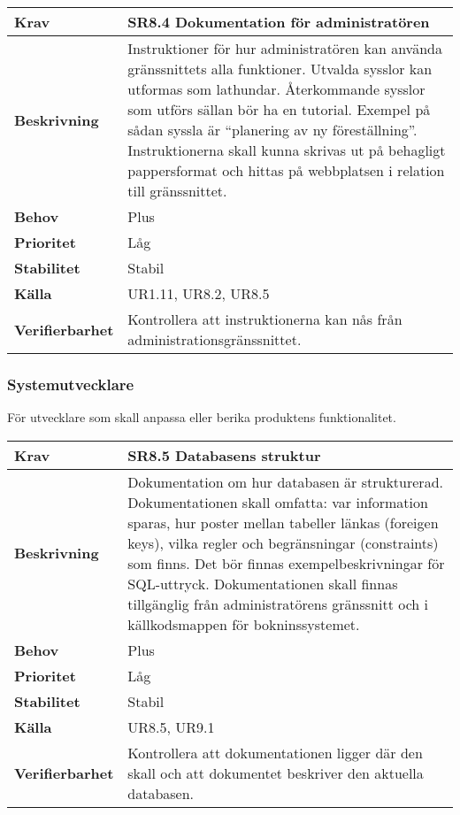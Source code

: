 \documentclass[a4paper, twoside, 11pt, titlepage]{article}
\begin{document}
		\begin {table} [ht] \begin{tabular} { p{2.6cm} p{12.5cm} }
			\hline
			\sffamily\textbf{Krav} & \sffamily\textbf{SR8.4 Dokumentation för administratören } \\
			\hline
			\sffamily\textbf{Beskrivning} & Instruktioner för hur administratören kan använda gränssnittets alla funktioner. Utvalda sysslor kan utformas som lathundar. Återkommande sysslor som utförs sällan bör ha en tutorial. Exempel på sådan syssla är ``planering av ny föreställning''. Instruktionerna skall kunna skrivas ut på behagligt pappersformat och hittas på webbplatsen i relation till gränssnittet.  \\
			\hline
			\sffamily\textbf{Behov} & Plus  \\
			\hline
			\sffamily\textbf{Prioritet} & Låg  \\
			\hline
			\sffamily\textbf{Stabilitet} & Stabil  \\
			\hline
			\sffamily\textbf{Källa} & UR1.11, UR8.2, UR8.5  \\
			\hline
			\sffamily\textbf{Verifierbarhet} & Kontrollera att instruktionerna kan nås från administrationsgränssnittet.  \\
			\hline
		\end{tabular} \end{table} \FloatBarrier


		\subsubsection{Systemutvecklare}


		För utvecklare som skall anpassa eller berika produktens funktionalitet.

		\begin {table} [ht] \begin{tabular} { p{2.6cm} p{12.5cm} }
			\hline
			\sffamily\textbf{Krav} & \sffamily\textbf{SR8.5 Databasens struktur } \\
			\hline
			\sffamily\textbf{Beskrivning} & Dokumentation om hur databasen är strukturerad. Dokumentationen skall omfatta: var information sparas, hur poster mellan tabeller länkas (foreigen keys), vilka regler och begränsningar (constraints) som finns. Det bör finnas exempelbeskrivningar för SQL-uttryck. Dokumentationen skall finnas tillgänglig från administratörens gränssnitt och i källkodsmappen för bokninssystemet.  \\
			\hline
			\sffamily\textbf{Behov} & Plus  \\
			\hline
			\sffamily\textbf{Prioritet} & Låg  \\
			\hline
			\sffamily\textbf{Stabilitet} & Stabil  \\
			\hline
			\sffamily\textbf{Källa} & UR8.5, UR9.1  \\
			\hline
			\sffamily\textbf{Verifierbarhet} & Kontrollera att dokumentationen ligger där den skall och att dokumentet beskriver den aktuella databasen.  \\
			\hline
		\end{tabular} \end{table} \FloatBarrier
		\vspace{6mm}
\end{document}
